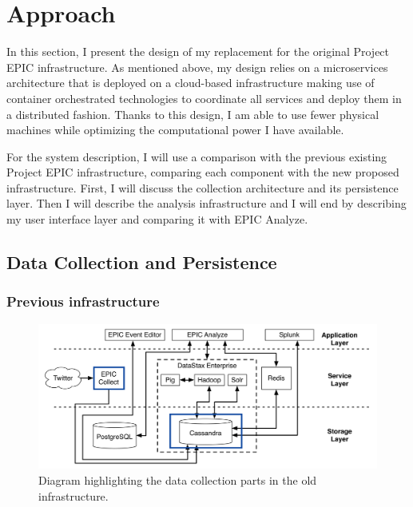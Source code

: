 \chapter{Approach}

In this section, I present the design of my replacement for the original Project EPIC infrastructure. As mentioned above, my design relies on a microservices architecture that is deployed on a cloud-based infrastructure making use of container orchestrated technologies to coordinate all services and deploy them in a distributed fashion. Thanks to this design, I am able to use fewer physical machines while optimizing the computational power I have available.

For the system description, I will use a comparison with the previous existing Project EPIC infrastructure, comparing each component with the new proposed infrastructure. First, I will discuss the collection architecture and its persistence layer. Then I will describe the analysis infrastructure and I will end by describing my user interface layer and comparing it with EPIC Analyze.

\section{Data Collection and Persistence}

\subsection{Previous infrastructure}

\begin{figure}[htbp]
	\caption{\label{fig:oldinfrcollection}
	Diagram highlighting the data collection parts in the old infrastructure.
	}
    \begin{center}
	\includegraphics[width=150mm]{figs/old-arch-collection.png}
    \end{center}
\label{xfigDiagram}
\end{figure}

